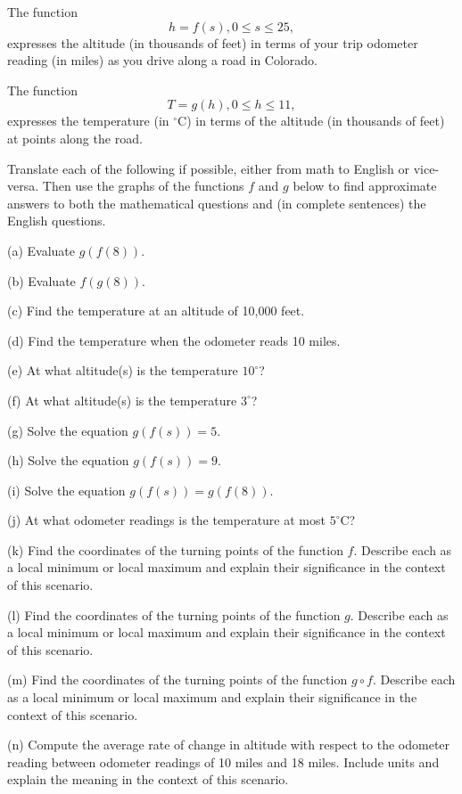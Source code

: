 \documentclass{ximera}
\begin{document}
\begin{example}  \label{Ex3:Comp}
The function
\[
     h = f(s) , 0\leq s \leq 25 ,
\]
expresses the altitude (in thousands of feet) in terms of your trip odometer reading (in miles) as you drive along a road in Colorado. 

The function 
\[
  T = g(h) , 0\leq h \leq 11 ,
\]
expresses the temperature (in $^\circ$C) in terms of the altitude (in thousands of feet) at points along the road.

Translate each of the following if possible, either from math to English or vice-versa. Then use the graphs of the functions $f$ and $g$ below to find approximate answers to both the mathematical questions and (in complete sentences) the English questions.

(a) Evaluate $g(f(8))$.

(b) Evaluate $f(g(8))$.

(c) Find the temperature at an altitude of 10,000 feet.

(d) Find the temperature when the odometer reads 10 miles.

(e) At what altitude(s) is the temperature $10^\circ$?

(f) At what altitude(s) is the temperature $3^\circ$?

(g) Solve the equation $g(f(s)) = 5$.

(h) Solve the equation $g(f(s)) = 9$.

(i) Solve the equation $g(f(s)) = g(f(8))$.

(j) At what odometer readings is the temperature at most $5^\circ$C?

(k) Find the coordinates of the turning points of the function $f$. Describe each as a local minimum or local maximum and explain their significance in the context of this scenario.

(l)  Find the coordinates of the turning points of the function $g$. Describe each as a local minimum or local maximum and explain their significance in the context of this scenario.

(m) Find the coordinates of the turning points of the function $g\circ f$. Describe each as a local minimum or local maximum and explain their significance in the context of this scenario.

(n) Compute the average rate of change in altitude with respect to the odometer reading between odometer readings of 10 miles and 18 miles. Include units and explain the meaning in the context of this scenario.


\end{example}
\end{document}
